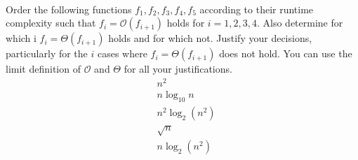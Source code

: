  \\
Order the following functions $f_1, f_2, f_3, f_4, f_5$ according to their
runtime complexity such that $f_i = \mathcal{O} (f_{i+1})$ holds for
$i = 1, 2, 3, 4$.
Also determine for which i $f_i = \Theta (f_{i+1})$ holds and for which not.
Justify your decisions, particularly for the $i$ cases where
$f_i = \Theta (f_{i+1})$ does not hold.
You can use the limit definition of $\mathcal{O}$ and $\Theta$ for all your
justifications.\\
\vspace{2em}
\begin{eqnarray*}
  &n^2\\
  &n\log_{10} n\\
  &n^2\log_2(n^2)\\
  &\sqrt{n}\\
  &n\log_2(n^2)
\end{eqnarray*}